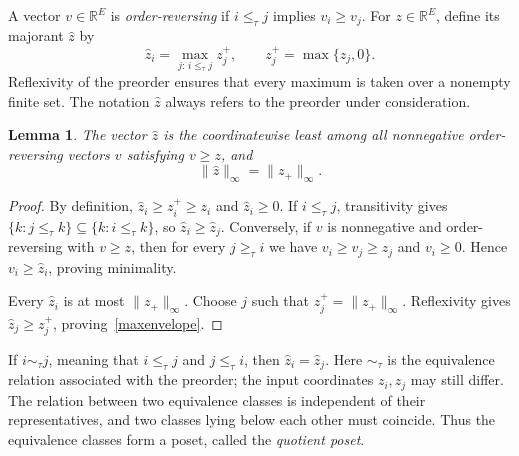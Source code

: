 \documentclass[11pt,reqno]{amsart}
\numberwithin{equation}{section}
\newtheorem{lemma}[theorem]{Lemma}
\theoremstyle{definition}
\theoremstyle{remark}
\theoremstyle{definition}
\begin{document}
A vector $v\in\mathbb R^E$ is \emph{order-reversing} if $i\le_\tau j$ implies $v_i\ge v_j$. For $z\in\mathbb R^E$, define its majorant $\widehat z$ by
\begin{equation}\label{envelopedef}
 \widehat z_i=\max_{j:\,i\le_\tau j}z_j^+,
 \qquad z_j^+=\max\{z_j,0\}.
\end{equation}
Reflexivity of the preorder ensures that every maximum is taken over a nonempty finite set. The notation $\widehat z$ always refers to the preorder under consideration.

\begin{lemma}\label{envelope}
The vector $\widehat z$ is the coordinatewise least among all nonnegative order-reversing vectors $v$ satisfying $v\ge z$, and
\begin{equation}\label{maxenvelope}
 \|\widehat z\|_\infty=\|z_+\|_\infty.
\end{equation}
\end{lemma}
\begin{proof}
By definition, $\widehat z_i\ge z_i^+\ge z_i$ and $\widehat z_i\ge0$. If $i\le_\tau j$, transitivity gives
$\{k:j\le_\tau k\}\subseteq\{k:i\le_\tau k\}$, so $\widehat z_i\ge\widehat z_j$.
Conversely, if $v$ is nonnegative and order-reversing with $v\ge z$, then for every $j\ge_\tau i$ we have $v_i\ge v_j\ge z_j$ and $v_i\ge0$. Hence $v_i\ge\widehat z_i$, proving minimality.

Every $\widehat z_i$ is at most $\|z_+\|_\infty$. Choose $j$ such that $z_j^+=\|z_+\|_\infty$. Reflexivity gives $\widehat z_j\ge z_j^+$, proving~\eqref{maxenvelope}.
\end{proof}

If $i\sim_\tau j$, meaning that $i\le_\tau j$ and $j\le_\tau i$, then $\widehat z_i=\widehat z_j$. Here $\sim_\tau$ is the equivalence relation associated with the preorder; the input coordinates $z_i,z_j$ may still differ. The relation between two equivalence classes is independent of their representatives, and two classes lying below each other must coincide. Thus the equivalence classes form a poset, called the \emph{quotient poset}.
\end{document}
